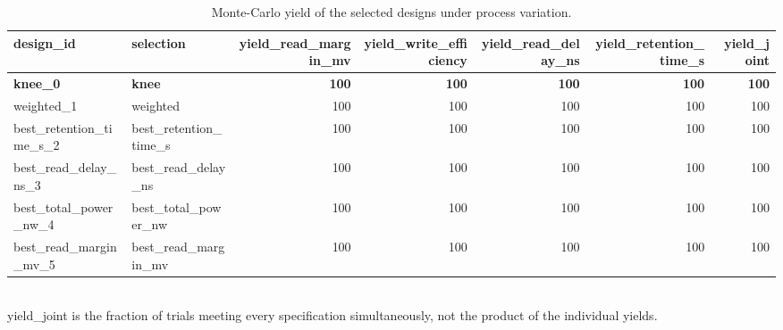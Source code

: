 \begin{table}[!t]
\centering
\caption{Monte-Carlo yield of the selected designs under process variation.}
\label{tab:robustness_yield_main}
\footnotesize
\begin{tabular}{llrrrrr}
\toprule
design\_id & selection & yield\_read\_margin\_mv & yield\_write\_efficiency & yield\_read\_delay\_ns & yield\_retention\_time\_s & yield\_joint \\
\midrule
\textbf{knee\_0} & \textbf{knee} & \textbf{100} & \textbf{100} & \textbf{100} & \textbf{100} & \textbf{100} \\
weighted\_1 & weighted & 100 & 100 & 100 & 100 & 100 \\
best\_retention\_time\_s\_2 & best\_retention\_time\_s & 100 & 100 & 100 & 100 & 100 \\
best\_read\_delay\_ns\_3 & best\_read\_delay\_ns & 100 & 100 & 100 & 100 & 100 \\
best\_total\_power\_nw\_4 & best\_total\_power\_nw & 100 & 100 & 100 & 100 & 100 \\
best\_read\_margin\_mv\_5 & best\_read\_margin\_mv & 100 & 100 & 100 & 100 & 100 \\
\bottomrule
\end{tabular}
\\[2pt] \footnotesize yield\_joint is the fraction of trials meeting every specification simultaneously, not the product of the individual yields.
\end{table}
